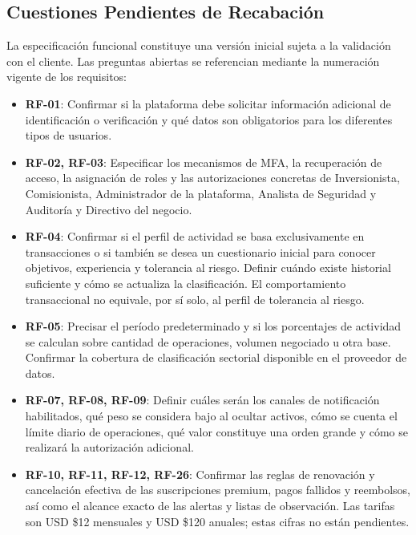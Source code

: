 \documentclass[11pt,a4paper,oneside]{article}
\begin{document}
\subsection{Cuestiones Pendientes de Recabación}

La especificación funcional constituye una versión inicial sujeta a la
validación con el cliente. Las preguntas abiertas se referencian
mediante la numeración vigente de los requisitos:

\begin{itemize}

\item \textbf{RF-01}: Confirmar si la plataforma debe solicitar
  información adicional de identificación o verificación y qué datos
  son obligatorios para los diferentes tipos de usuarios.

\item \textbf{RF-02, RF-03}: Especificar los mecanismos de MFA,
  la recuperación de acceso, la asignación de roles y las autorizaciones
  concretas de Inversionista, Comisionista, Administrador de la plataforma,
  Analista de Seguridad y Auditoría y Directivo del negocio.

\item \textbf{RF-04}: Confirmar si el perfil de actividad se basa
  exclusivamente en transacciones o si también se desea un cuestionario
  inicial para conocer objetivos, experiencia y tolerancia al riesgo.
  Definir cuándo existe historial suficiente y cómo se actualiza
  la clasificación. El comportamiento transaccional no equivale,
  por sí solo, al perfil de tolerancia al riesgo.

\item \textbf{RF-05}: Precisar el período predeterminado y si
  los porcentajes de actividad se calculan sobre cantidad de operaciones,
  volumen negociado u otra base. Confirmar la cobertura de clasificación
  sectorial disponible en el proveedor de datos.

\item \textbf{RF-07, RF-08, RF-09}: Definir cuáles serán los canales
  de notificación habilitados, qué peso se considera bajo al ocultar
  activos, cómo se cuenta el límite diario de operaciones, qué valor
  constituye una orden grande y cómo se realizará la autorización adicional.

\item \textbf{RF-10, RF-11, RF-12, RF-26}: Confirmar las reglas
  de renovación y cancelación efectiva de las suscripciones premium,
  pagos fallidos y reembolsos, así como el alcance exacto de las alertas
  y listas de observación. Las tarifas son USD \$12 mensuales
  y USD \$120 anuales; estas cifras no están pendientes.


\end{itemize}
\end{document}
